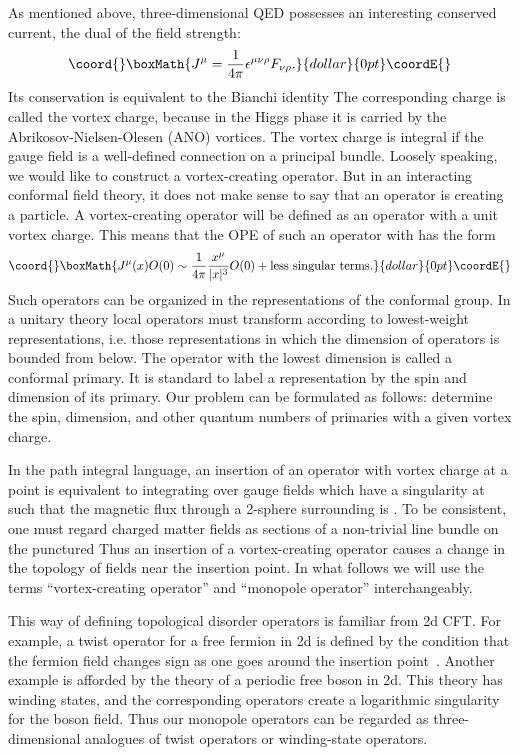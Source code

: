 \documentclass[a4paper,12pt, amsfonts, amssymb]{article}
\providecommand{\RR}{{\mathbb R}}
\providecommand{\eps}{\epsilon}
\begin{document}
As mentioned above, three-dimensional QED possesses an interesting conserved current, the dual of the field strength:
$$\coord{}\boxMath{
J^\mu=\frac{1}{4\pi}\eps^{\mu\nu\rho} F_{\nu\rho}.
}{dollar}{0pt}\coordE{}$$
Its conservation is equivalent to the Bianchi identity \coordHE{}
The corresponding charge is called the vortex charge, because in the
Higgs phase it is carried by the Abrikosov-Nielsen-Olesen (ANO)
vortices. The vortex charge is integral if the gauge field \coordHE{} is
a well-defined connection on a \coordHE{} principal bundle. Loosely speaking,
we would like to construct a vortex-creating operator. 
But in an interacting conformal field theory, 
it does not make sense to say that an 
operator is creating a particle. A vortex-creating operator will 
be defined as an operator with a unit vortex charge. This means that the
OPE of such an operator with \coordHE{} has the form
$$\coord{}\boxMath{
J^\mu(x) O(0)\sim \frac{1}{4\pi}\frac{x^\mu}{|x|^3} O(0)+
{\rm less\ singular\ terms}.
}{dollar}{0pt}\coordE{}$$
Such operators can be organized in the representations of the conformal
group. In a unitary theory local operators must transform
according to lowest-weight representations, i.e.
those representations in which the dimension of operators is bounded
from below. The operator with the lowest dimension is called a conformal
primary. It is standard to label a representation by the spin and dimension 
of its primary. Our problem can be formulated
as follows: determine the spin, dimension, and other quantum numbers
of primaries with a given vortex charge.

In the path integral language, an insertion of an operator with vortex
charge \coordHE{} at a point \coordHE{} is equivalent to integrating
over gauge fields which have a singularity at \coordHE{} such that
the magnetic flux through a 2-sphere surrounding \coordHE{} is \coordHE{}.
To be consistent, one must regard charged matter fields as sections
of a non-trivial line bundle on the punctured \myHighlight{$\RR^3.$}\coordHE{} Thus
an insertion of a vortex-creating operator causes a change in the topology
of fields near the insertion point. In what follows we will use the
terms ``vortex-creating operator'' and ``monopole operator'' 
interchangeably.

This way of defining topological
disorder operators is familiar from 2d CFT. For example, a twist
operator for a free fermion in 2d is defined by the condition that the
fermion field changes sign as one goes around the insertion 
point~\cite{Ginsparg}.
Another example is afforded by the theory of a periodic free boson in 2d.
This theory has winding states, and the corresponding operators
create a logarithmic singularity for the boson field.  
Thus our monopole operators can be regarded as three-dimensional analogues
of twist operators or winding-state operators.
\end{document}
